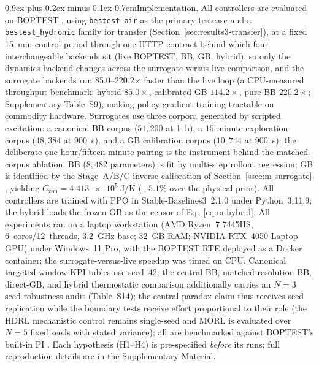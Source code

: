 \documentclass[a4paper,fleqn]{cas-sc}
\makeatletter
\renewcommand\paragraph{\@startsection{paragraph}{4}{\z@}%
 {0.9ex plus 0.2ex minus 0.1ex}{-0.7em}{\normalfont\normalsize\bfseries}}
\newcommand{\Czon}{\ensuremath{C_{\mathrm{zon}}}}
\newcommand{\suppref}[1]{#1}
\makeatother
\begin{document}
\paragraph{Implementation.}\label{sec:setup}\label{ssec:s-testbed}\label{ssec:s-data}\label{ssec:s-train}
All controllers are evaluated on BOPTEST \citep{Blum2021BOPTEST,Wetter2014Modelica,Arroyo2021GymBOPTEST}, using \texttt{bestest\_air} as the primary testcase and a \texttt{bestest\_hydronic} family for transfer (Section~\ref{sec:results3-transfer}), at a fixed \SI{15}{\minute} control period through one HTTP contract behind which four interchangeable backends sit (live BOPTEST, BB, GB, hybrid), so only the dynamics backend changes across the surrogate-versus-live comparison, and the surrogate backends run \numrange{85.0}{220.2}$\times$ faster than the live loop (a CPU-measured throughput benchmark; hybrid $85.0\times$, calibrated GB $114.2\times$, pure BB $220.2\times$; Supplementary Table~\suppref{S9}), making policy-gradient training tractable on commodity hardware. Surrogates use three corpora generated by scripted excitation: a canonical BB corpus ($51{,}200$ at \SI{1}{\hour}), a $15$-minute exploration corpus ($48{,}384$ at \SI{900}{\second}), and a GB calibration corpus ($10{,}744$ at \SI{900}{\second}); the deliberate one-hour/fifteen-minute pairing is the instrument behind the matched-corpus ablation. BB ($8{,}482$ parameters) is fit by multi-step rollout regression; GB is identified by the Stage~A/B/C inverse calibration of Section~\ref{ssec:m-surrogate} \citep{Bacher2011RCIdentification}, yielding $\Czon=\SI{4.413e5}{\joule\per\kelvin}$ ($+5.1\%$ over the physical prior). All controllers are trained with PPO \citep{Schulman2017PPO} in Stable-Baselines3~2.1.0 \citep{Raffin2021SB3} under Python~3.11.9; the hybrid loads the frozen GB as the censor of Eq.~\eqref{eq:m-hybrid}. All experiments ran on a laptop workstation (AMD Ryzen~7 7445HS, 6~cores/12~threads, 3.2~GHz base; 32~GB RAM; NVIDIA RTX~4050 Laptop GPU) under Windows~11 Pro, with the BOPTEST RTE deployed as a Docker container; the surrogate-versus-live speedup was timed on CPU. Canonical targeted-window KPI tables use seed~42; the central BB, matched-resolution BB, direct-GB, and hybrid thermostatic comparison additionally carries an $N=3$ seed-robustness audit (Table~\suppref{S14}); the central paradox claim thus receives seed replication while the boundary tests receive effort proportional to their role (the HDRL mechanistic control remains single-seed and MORL is evaluated over $N=5$ fixed seeds with stated variance); all are benchmarked against BOPTEST's built-in PI \citep{Wang2025SafeDRL}. Each hypothesis (H1--H4) is pre-specified \emph{before} its runs; full reproduction details are in the Supplementary Material.
\end{document}
